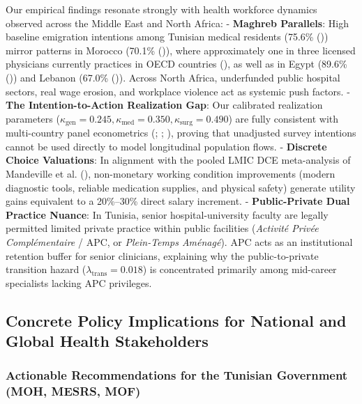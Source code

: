 \documentclass[
  11pt,
  a4paper]{article}
\begin{document}
Our empirical findings resonate strongly with health workforce dynamics
observed across the Middle East and North Africa: - \textbf{Maghreb
Parallels}: High baseline emigration intentions among Tunisian medical
residents (75.6\% ())
mirror patterns in Morocco (70.1\% ()), where approximately one in three licensed physicians
currently practices in OECD countries (), as well as in Egypt (89.6\%
()) and Lebanon (67.0\%
()). Across North Africa,
underfunded public hospital sectors, real wage erosion, and workplace
violence act as systemic push factors. - \textbf{The Intention-to-Action
Realization Gap}: Our calibrated realization parameters
(\(\kappa_{\text{gen}} = 0.245, \kappa_{\text{med}} = 0.350, \kappa_{\text{surg}} = 0.490\))
are fully consistent with multi-country panel econometrics
(;
;
), proving that unadjusted
survey intentions cannot be used directly to model longitudinal
population flows. - \textbf{Discrete Choice Valuations}: In alignment
with the pooled LMIC DCE meta-analysis of Mandeville et al.
(), non-monetary working condition
improvements (modern diagnostic tools, reliable medication supplies, and
physical safety) generate utility gains equivalent to a 20\%--30\%
direct salary increment. - \textbf{Public-Private Dual Practice Nuance}:
In Tunisia, senior hospital-university faculty are legally permitted
limited private practice within public facilities (\emph{Activité Privée
Complémentaire} / APC, or \emph{Plein-Temps Aménagé}). APC acts as an
institutional retention buffer for senior clinicians, explaining why the
public-to-private transition hazard (\(\lambda_{\text{trans}} = 0.018\))
is concentrated primarily among mid-career specialists lacking APC
privileges.

\subsection{Concrete Policy Implications for National and Global Health
Stakeholders}\label{sec-discussion-policy}

\subsubsection{Actionable Recommendations for the Tunisian Government
(MOH, MESRS,
MOF)}\label{actionable-recommendations-for-the-tunisian-government-moh-mesrs-mof}
\end{document}
